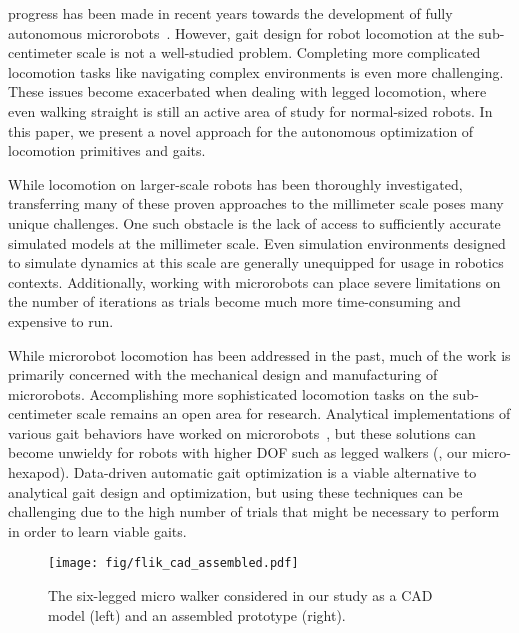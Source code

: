 progress has been made in recent years towards the development of fully autonomous microrobots~\citep{saito_miniaturized_2016,Vogtmann2017}.
However, gait design for robot locomotion at the sub-centimeter scale is not a well-studied problem.
Completing more complicated locomotion tasks like navigating complex environments is even more challenging.
These issues become exacerbated when dealing with legged locomotion, where even walking straight is still an active area of study for normal-sized robots.
In this paper, we present a novel approach for the autonomous optimization of locomotion primitives and gaits.

While locomotion on larger-scale robots has been thoroughly investigated, transferring many of these proven approaches to the millimeter scale poses many unique challenges.
One such obstacle is the lack of access to sufficiently accurate simulated models at the millimeter scale.
Even simulation environments designed to simulate dynamics at this scale are generally unequipped for usage in robotics contexts.
Additionally, working with microrobots can place severe limitations on the number of iterations as trials become much more time-consuming and expensive to run.

While microrobot locomotion has been addressed in the past, much of the work is primarily concerned with the mechanical design and manufacturing of microrobots.
Accomplishing more sophisticated locomotion tasks on the sub-centimeter scale remains an open area for research.
Analytical implementations of various gait behaviors have worked on microrobots~\citep{ebefors_walking_1999,hollar_solar_2003}, but these solutions can become unwieldy for robots with higher DOF such as legged walkers (\eg, our micro-hexapod).
Data-driven automatic gait optimization is a viable alternative to analytical gait design and optimization, but using these techniques can be challenging due to the high number of trials that might be necessary to perform in order to learn viable gaits.

%
\begin{figure}[t]
  \centering
  \texttt{[image: fig/flik\_cad\_assembled.pdf]}
  \caption{The six-legged micro walker considered in our study as a CAD model (left) and an assembled prototype (right).}
  \label{fig:flik_cad}
 \vspace{-10pt}
\end{figure}
% 

